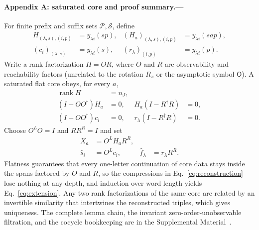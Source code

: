 \documentclass[aps,prl,reprint,superscriptaddress,nofootinbib]{revtex4-2}
\newcommand{\rank}{\operatorname{rank}}
\begin{document}
\paragraph{Appendix A: saturated core and proof summary.---}
\label{app:core}
For finite prefix and suffix sets $\mathcal P,\mathcal S$, define
\begin{align}
 H_{(\lambda,s),(i,p)}&=y_{\lambda i}(sp),&
 (H_a)_{(\lambda,s),(i,p)}&=y_{\lambda i}(sap),\nonumber\\
 (c_i)_{(\lambda,s)}&=y_{\lambda i}(s),&
 (r_\lambda)_{(i,p)}&=y_{\lambda i}(p).
 \label{eq:hankel}
\end{align}
Write a rank factorization $H=OR$, where $O$ and $R$ are observability and reachability factors (unrelated to the rotation $R_x$ or the asymptotic symbol $\mathsf O$).  A saturated flat core obeys, for every $a$,
\begin{equation}
 \begin{aligned}
 \rank H&=n_J,\\
 (I-OO^\dagger)H_a&=0,
 &H_a(I-R^\dagger R)&=0,\\
 (I-OO^\dagger)c_i&=0,
 &r_\lambda(I-R^\dagger R)&=0.
 \end{aligned}
 \label{eq:flat}
\end{equation}
Choose $O^LO=I$ and $RR^R=I$ and set
\begin{align}
 X_a&=O^LH_aR^R,\nonumber\\
 \widehat s_i&=O^Lc_i,
 &\widehat f_\lambda&=r_\lambda R^R.
 \label{eq:reconstruction}
\end{align}
Flatness guarantees that every one-letter continuation of core data stays inside the spans factored by $O$ and $R$, so the compressions in Eq.~\eqref{eq:reconstruction} lose nothing at any depth, and induction over word length yields Eq.~\eqref{eq:extension}.  Any two rank factorizations of the same core are related by an invertible similarity that intertwines the reconstructed triples, which gives uniqueness.  The complete lemma chain, the invariant zero-order-unobservable filtration, and the cocycle bookkeeping are in the Supplemental Material~\cite{SupplementalMaterial}.

\setcounter{equation}{0}
\renewcommand{\theequation}{B\arabic{equation}}
\end{document}
